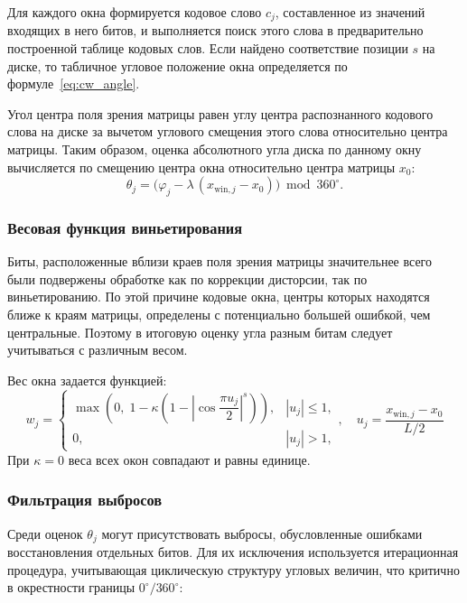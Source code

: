 Для каждого окна формируется кодовое слово $c_j$, составленное из значений входящих в него битов, и выполняется поиск этого слова в предварительно построенной таблице кодовых слов. Если найдено соответствие позиции $s$ на диске, то табличное угловое положение окна определяется по формуле~\eqref{eq:cw_angle}.

Угол центра поля зрения матрицы равен углу центра распознанного кодового слова на диске за вычетом углового смещения этого слова относительно центра матрицы. Таким образом, оценка абсолютного угла диска по данному окну вычисляется по смещению центра окна относительно центра матрицы $x_0$:
\begin{equation*}
    \theta_j = \bigl(\varphi_j - \lambda\,(x_{\mathrm{win},j} - x_0)\bigr) \bmod 360^\circ.
\end{equation*}

\subsubsection{Весовая функция виньетирования}

Биты, расположенные вблизи краев поля зрения матрицы значительнее всего были подвержены обработке как по коррекции дисторсии, так по виньетированию. По этой причине кодовые окна, центры которых находятся ближе к краям матрицы, определены с потенциально большей ошибкой, чем центральные. Поэтому в итоговую оценку угла разным битам следует учитываться с различным весом.

Вес окна задается функцией:
\begin{equation}
    w_j = \begin{cases}
        \max\!\left(0,\;1 - \kappa\!\left(1 - \left|\cos\!\dfrac{\pi u_j}{2}\right|^s\right)\right), & |u_j| \leq 1,\\[6pt]
        0, & |u_j| > 1,
    \end{cases}, \quad  u_j = \frac{x_{\mathrm{win},j} - x_0}{L/2}
    \label{eq:vign_weight}
\end{equation}
При $\kappa = 0$ веса всех окон совпадают и равны единице.

\subsubsection{Фильтрация выбросов}

Среди оценок $\theta_j$ могут присутствовать выбросы, обусловленные ошибками восстановления отдельных битов. Для их исключения используется итерационная процедура, учитывающая циклическую структуру угловых величин, что критично в окрестности границы $0^\circ/360^\circ$:

